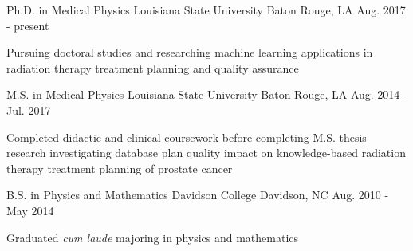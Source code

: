 

\begin{cventries}

  \cventry
    {Ph.D. in Medical Physics} %
    {Louisiana State University} %
    {Baton Rouge, LA} %
    {Aug. 2017 - present} %
    {
      \begin{cvitems} %
        \item {Pursuing doctoral studies and researching machine learning applications in radiation therapy treatment planning and quality assurance}
      \end{cvitems}
    }

  \cventry
    {M.S. in Medical Physics} %
    {Louisiana State University} %
    {Baton Rouge, LA} %
    {Aug. 2014 - Jul. 2017} %
    {
    \begin{cvitems} %
      \item {Completed didactic and clinical coursework before completing M.S. thesis research investigating database plan quality impact on knowledge-based radiation therapy treatment planning of prostate cancer}
    \end{cvitems}
    }

  \cventry
    {B.S. in Physics and Mathematics} %
    {Davidson College} %
    {Davidson, NC} %
    {Aug. 2010 - May 2014} %
    {
    \begin{cvitems} %
      \item {Graduated \textit{cum laude} majoring in physics and mathematics}
    \end{cvitems}
    }

\end{cventries}
